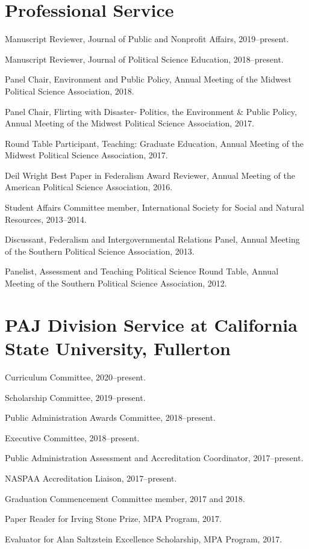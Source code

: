 \documentclass[11pt,letterpaper]{article}
\renewenvironment{itemize}{
  \begin{list}{}{
    \setlength{\leftmargin}{1.5em}
    \setlength{\itemsep}{0.25em}
    \setlength{\parskip}{0pt}
    \setlength{\parsep}{0.25em}
  }
}{
  \end{list}
}
\begin{document}
\section*{Professional Service}
\begin{itemize}\leftmargin=2pt\itemindent=-15pt
	\item Manuscript Reviewer, Journal of Public and Nonprofit Affairs, 2019--present.
	\item Manuscript Reviewer, Journal of Political Science Education, 2018--present.
	\item Panel Chair, Environment and Public Policy, Annual Meeting of the Midwest Political Science Association, 2018.
	\item Panel Chair, Flirting with Disaster- Politics, the Environment \& Public Policy, Annual Meeting of the Midwest Political Science Association, 2017. 
	\item Round Table Participant, Teaching: Graduate Education, Annual Meeting of the Midwest Political Science Association, 2017.
	\item Deil Wright Best Paper in Federalism Award Reviewer, Annual Meeting of the American Political Science Association, 2016.
	\item Student Affairs Committee member, International Society for Social and Natural Resources, 2013--2014.
	\item Discussant, Federalism and Intergovernmental Relations Panel, Annual Meeting of the Southern Political Science Association, 2013.
	\item Panelist, Assessment and Teaching Political Science Round Table, Annual Meeting of the Southern Political Science Association, 2012.
\end{itemize}

\section*{PAJ Division Service at California State University, Fullerton}
	\begin{itemize}
		\item Curriculum Committee, 2020--present.
		\item Scholarship Committee, 2019--present.
		\item Public Administration Awards Committee, 2018--present. 
		\item Executive Committee, 2018--present. 
		\item Public Administration Assessment and Accreditation Coordinator, 2017--present.
		\item NASPAA Accreditation Liaison, 2017--present.
		\item Graduation Commencement Committee member, 2017 and 2018.
		\item Paper Reader for Irving Stone Prize, MPA Program, 2017.
		\item Evaluator for Alan Saltzstein Excellence Scholarship, MPA Program, 2017. 
	\end{itemize}
\end{document}
